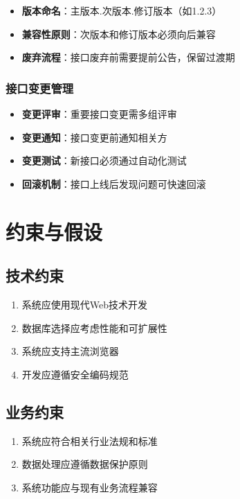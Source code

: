 \documentclass[a4paper,12pt]{article}
\begin{document}
\begin{itemize}
  \item \textbf{版本命名}：主版本.次版本.修订版本（如1.2.3）
  \item \textbf{兼容性原则}：次版本和修订版本必须向后兼容
  \item \textbf{废弃流程}：接口废弃前需要提前公告，保留过渡期
\end{itemize}

\subsubsection{接口变更管理}

\begin{itemize}
  \item \textbf{变更评审}：重要接口变更需多组评审
  \item \textbf{变更通知}：接口变更前通知相关方
  \item \textbf{变更测试}：新接口必须通过自动化测试
  \item \textbf{回滚机制}：接口上线后发现问题可快速回滚
\end{itemize}

\section{约束与假设}

\subsection{技术约束}

\begin{enumerate}
  \item 系统应使用现代Web技术开发
  \item 数据库选择应考虑性能和可扩展性
  \item 系统应支持主流浏览器
  \item 开发应遵循安全编码规范
\end{enumerate}

\subsection{业务约束}

\begin{enumerate}
  \item 系统应符合相关行业法规和标准
  \item 数据处理应遵循数据保护原则
  \item 系统功能应与现有业务流程兼容
\end{enumerate}
\end{document}

